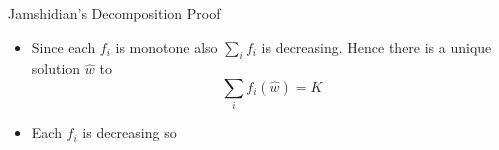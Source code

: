 \documentclass{beamer}
\begin{document}
\begin{frame}{Jamshidian's Decomposition Proof}
\begin{itemize}
	\item<1-> Since each $f_i$ is monotone also $\sum_i f_i$ is decreasing. Hence there is a unique solution $\hat{w}$ to 
	\begin{equation*}
		\sum_i f_i(\hat{w}) = K
	\end{equation*}
	\item<2-> Each $f_i$ is decreasing so
	\begin{columns}
\end{columns}
\end{itemize}
\end{frame}
\end{document}
